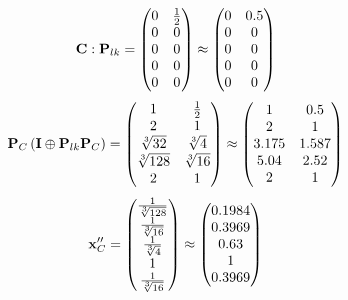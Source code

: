 \documentclass[10pt,a4paper]{article}
\begin{document}
	\[
		\bold{C}: \bold{P}_{lk} = 
		\begin{pmatrix}
			{{0}} {} & \frac{1} {{2}} \\
			{{0}} {} & {{0}} {} \\
			{{0}} {} & {{0}} {} \\
			{{0}} {} & {{0}} {} \\
			{{0}} {} & {{0}} {} \\
		\end{pmatrix}
		\approx
		\begin{pmatrix}
			0        & 0.5      \\
			0        & 0        \\
			0        & 0        \\
			0        & 0        \\
			0        & 0        \\
		\end{pmatrix}
	\]
	\[
		\bold{P}_{C}\left(\bold{I} \oplus \bold{P}_{lk}\bold{P}_{C}\right) = 
		\begin{pmatrix}
			{1} {} & \frac{1} {{2}} \\
			{{2}} {} & {1} {} \\
			{\sqrt[3]{32}} {} & {\sqrt[3]{4}} {} \\
			{\sqrt[3]{128}} {} & {\sqrt[3]{16}} {} \\
			{{2}} {} & {1} {} \\
		\end{pmatrix}
		\approx
		\begin{pmatrix}
			1        & 0.5      \\
			2        & 1        \\
			3.175    & 1.587    \\
			5.04     & 2.52     \\
			2        & 1        \\
		\end{pmatrix}
	\]
	\[
		\bold{x}''_{C} = 
		\begin{pmatrix}
			\frac{1} {\sqrt[3]{128}} \\
			\frac{1} {\sqrt[3]{16}} \\
			\frac{1} {\sqrt[3]{4}} \\
			{1} {} \\
			\frac{1} {\sqrt[3]{16}} \\
		\end{pmatrix}
		\approx
		\begin{pmatrix}
			0.1984   \\
			0.3969   \\
			0.63     \\
			1        \\
			0.3969   \\
		\end{pmatrix}
	\]
\end{document}
